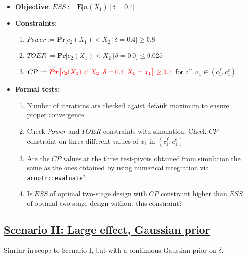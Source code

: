 \documentclass[]{book}
\providecommand{\tightlist}{%
  \setlength{\itemsep}{0pt}\setlength{\parskip}{0pt}}
\begin{document}
\begin{itemize}
\tightlist
\item
  \textbf{Objective:} \(ESS := \boldsymbol{E}\big[n(X_1)\,|\,\delta=0.4\big]\)
\item
  \textbf{Constraints:}

  \begin{enumerate}
  \def\labelenumi{\arabic{enumi}.}
  \tightlist
  \item
    \(Power := \boldsymbol{Pr}\big[c_2(X_1) < X_2\,|\,\delta=0.4\big] \geq 0.8\)
  \item
    \(TOER := \boldsymbol{Pr}\big[c_2(X_1) < X_2\,|\,\delta=0.0\big] \leq 0.025\)
  \item
    \(CP := \color{red}{\boldsymbol{Pr}\big[c_2(X_1) < X_2\,|\,\delta=0.4, X_1 = x_1\big] \geq 0.7}\) for all \(x_1\in(c_1^f, c_1^e)\)
  \end{enumerate}
\item
  \textbf{Formal tests:}

  \begin{enumerate}
  \def\labelenumi{\arabic{enumi}.}
  \tightlist
  \item
    Number of iterations are checked agaist default maximum to ensure proper
    convergence.
  \item
    Check \(Power\) and \(TOER\) constraints with simulation.
    Check \(CP\) constraint on three different values of \(x_1\) in
    \((c_1^f, c_1^e)\)
  \item
    Are the \(CP\) values at the three test-pivots obtained from simulation the
    same as the ones obtained by using numerical integration via
    \texttt{adoptr::evaluate}?
  \item
    Is \(ESS\) of optimal two-stage design with \(CP\) constraint higher than
    \(ESS\) of optimal two-stage design without this constraint?
  \end{enumerate}
\end{itemize}

\hypertarget{scenario-ii-large-effect-gaussian-prior}{%
\subsection{\texorpdfstring{\protect\hyperlink{scenarioII}{Scenario II: Large effect, Gaussian prior}}{Scenario II: Large effect, Gaussian prior}}\label{scenario-ii-large-effect-gaussian-prior}}

Similar in scope to Scenario I, but with a continuous Gaussian prior on \(\delta\).
\end{document}
